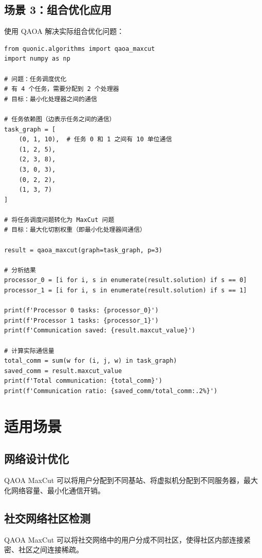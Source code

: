 \documentclass[12pt,a4paper]{article}
\begin{document}
\subsection{场景 3：组合优化应用}

使用 QAOA 解决实际组合优化问题：

\begin{verbatim}
from quonic.algorithms import qaoa_maxcut
import numpy as np

# 问题：任务调度优化
# 有 4 个任务，需要分配到 2 个处理器
# 目标：最小化处理器之间的通信

# 任务依赖图（边表示任务之间的通信）
task_graph = [
    (0, 1, 10),  # 任务 0 和 1 之间有 10 单位通信
    (1, 2, 5),
    (2, 3, 8),
    (3, 0, 3),
    (0, 2, 2),
    (1, 3, 7)
]

# 将任务调度问题转化为 MaxCut 问题
# 目标：最大化切割权重（即最小化处理器间通信）

result = qaoa_maxcut(graph=task_graph, p=3)

# 分析结果
processor_0 = [i for i, s in enumerate(result.solution) if s == 0]
processor_1 = [i for i, s in enumerate(result.solution) if s == 1]

print(f'Processor 0 tasks: {processor_0}')
print(f'Processor 1 tasks: {processor_1}')
print(f'Communication saved: {result.maxcut_value}')

# 计算实际通信量
total_comm = sum(w for (i, j, w) in task_graph)
saved_comm = result.maxcut_value
print(f'Total communication: {total_comm}')
print(f'Communication ratio: {saved_comm/total_comm:.2%}')
\end{verbatim}

\section{适用场景}

\subsection{网络设计优化}

QAOA MaxCut 可以将用户分配到不同基站、将虚拟机分配到不同服务器，最大化网络容量、最小化通信开销。

\subsection{社交网络社区检测}

QAOA MaxCut 可以将社交网络中的用户分成不同社区，使得社区内部连接紧密、社区之间连接稀疏。
\end{document}
